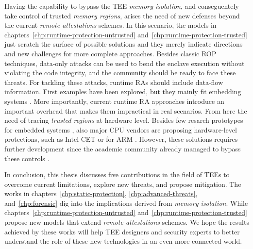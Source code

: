 Having the capability to bypass the TEE \emph{memory isolation}, and 
conseguentely take control of trusted  \emph{memory regions}, arises the need 
of new defenses beyond the current \emph{remote attestations} schemes.
In this scenario, the models in chapters~\ref{chp:runtime-protection-untrusted} 
and~\ref{chp:runtime-protection-trusted} just scratch the surface of 
possible solutions and they merely indicate directions and new challenges for 
more complete approaches.
Besides classic ROP techniques, data-only attacks can be used to bend the 
enclave execution without violating the code integrity, and the community 
should be ready to face these threats.
For tackling these attacks, runtime RAs should include data-flow information.
First examples have been explored, but they mainly fit embedding systems 
\citep{sun2020oat,aberadiat}.
More importantly, current runtime RA approaches introduce an important overhead 
that makes them impractical in real scenarios.
From here the need of tracing \emph{trusted regions} at hardware level.
Besides few resarch prototypes for embedded systems 
\citep{Dessouky:2018:LLH:3240765.3240821}, also major CPU vendors are proposing 
hardware-level protections, such as Intel CET \citep{intelcet} or for ARM 
\citep{armpa}.
However, these solutions requires further development since the academic 
community already managed to bypass these controls \citep{van2012memory}.

In conclusion, this thesis discusses five contributions in the field of TEEs to 
overcome current limitations, explore new threats, and propose mitigation.
The works in chapters~\ref{chp:static-protection}, \ref{chp:advanced-threats}, 
and~\ref{chp:forensic} dig into the implications derived from \emph{memory 
isolation}.
While chapters~\ref{chp:runtime-protection-untrusted} 
and~\ref{chp:runtime-protection-trusted} propose new models that extend 
\emph{remote attestations} schemes.
We hope the results achieved by these works will help TEE designers and 
security experts to better understand the role of these new technologies in 
an even more connected world.


